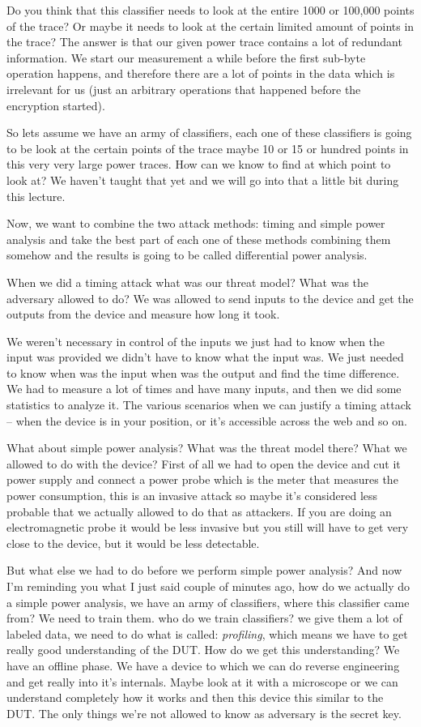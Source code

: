 Do you think that this classifier needs to look at the entire 1000 or 100,000 points of the trace? Or maybe it needs to look at the certain limited amount of points in the trace?
The answer is that our given power trace contains a lot of redundant information. We start our measurement a while before the first sub-byte operation happens, and therefore there are a lot of points in the data which is irrelevant for us (just an arbitrary operations that happened before the encryption started).

So lets assume we have an army of classifiers, each one of these classifiers is going to be look at the certain points of the trace maybe 10 or 15 or hundred points in this very very large power traces. How can we know to find at which point to look at? We haven't taught that yet and we will go into that a little bit during this lecture. 
 
Now, we want to combine the two attack methods: timing and simple power analysis and take the best part of each one of these methods combining them somehow and the results is going to be called differential power analysis.
 
When we did a timing attack what was our threat model? What was the adversary allowed to do? We was allowed to send inputs to the device and get the outputs from the device and measure how long it took.
 
We weren't necessary in control of the inputs we just had to know when the input was provided we didn't have to know what the input was. We just needed to know when was the input when was the output and find the time difference. We had to measure a lot of times and have many inputs, and then we did some statistics to analyze it.
The various scenarios when we can justify a timing attack – when the device is in your position, or it's accessible across the web and so on.

What about simple power analysis? What was the threat model there? What we allowed to do with the device?
First of all we had to open the device and cut it power supply and connect a power probe which is the meter that measures the power consumption, this is an invasive attack so maybe it's considered less probable that we actually allowed to do that as attackers. If you are doing an electromagnetic probe it would be less invasive but you still will have to get very close to the device, but it would be less detectable. 

But what else we had to do before we perform simple power analysis? And now I'm reminding you what I just said couple of minutes ago, how do we actually do a simple power analysis, we have an army of classifiers, where this classifier came from? We need to train them. who do we train classifiers? we give them a lot of labeled data, we need to do what is called: \textit{profiling}, which means we have to get really good understanding of the DUT.
How do we get this understanding? We have an offline phase.
We have a device to which we can do reverse engineering and get really into it's internals. Maybe look at it with a microscope or we can understand completely how it works and then this device this similar to the DUT. The only things we're not allowed to know as adversary is the secret key.

